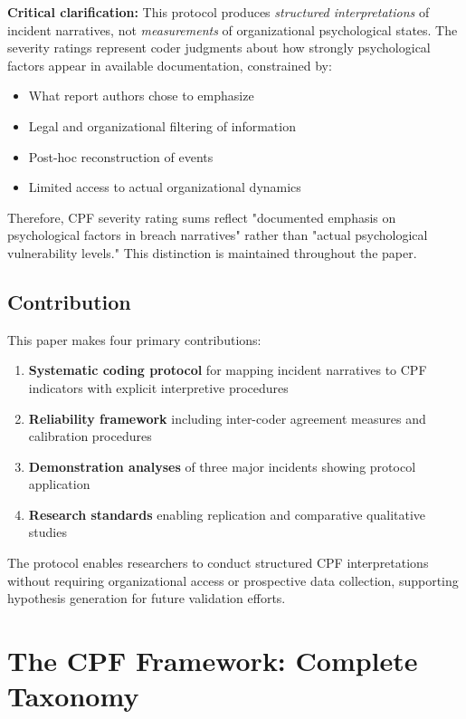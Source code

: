 \documentclass[11pt,a4paper]{article}
\begin{document}
\textbf{Critical clarification:} This protocol produces \textit{structured interpretations} of incident narratives, not \textit{measurements} of organizational psychological states. The severity ratings represent coder judgments about how strongly psychological factors appear in available documentation, constrained by:

\begin{itemize}
\item What report authors chose to emphasize
\item Legal and organizational filtering of information
\item Post-hoc reconstruction of events
\item Limited access to actual organizational dynamics
\end{itemize}

Therefore, CPF severity rating sums reflect "documented emphasis on psychological factors in breach narratives" rather than "actual psychological vulnerability levels." This distinction is maintained throughout the paper.

\subsection{Contribution}

This paper makes four primary contributions:

\begin{enumerate}
\item \textbf{Systematic coding protocol} for mapping incident narratives to CPF indicators with explicit interpretive procedures
\item \textbf{Reliability framework} including inter-coder agreement measures and calibration procedures
\item \textbf{Demonstration analyses} of three major incidents showing protocol application
\item \textbf{Research standards} enabling replication and comparative qualitative studies
\end{enumerate}

The protocol enables researchers to conduct structured CPF interpretations without requiring organizational access or prospective data collection, supporting hypothesis generation for future validation efforts.

\section{The CPF Framework: Complete Taxonomy}
\end{document}
